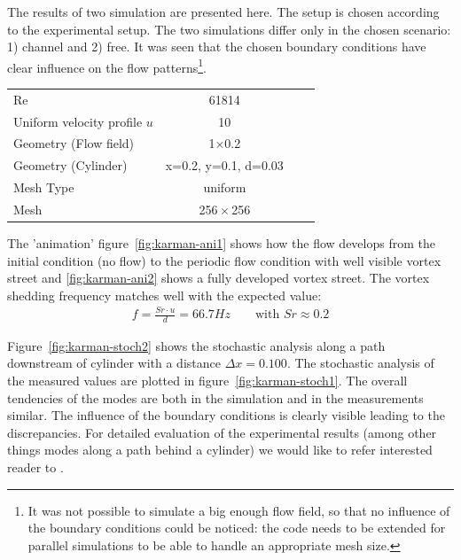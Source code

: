 \noii The results of two simulation are presented here. The setup is chosen according to the experimental setup. The two simulations differ only in the chosen scenario: 1) channel and 2) free. It was seen that the chosen boundary conditions have clear influence on the flow patterns\footnote{It was not possible to simulate a big enough flow field, so that no influence of the boundary conditions could be noticed: the code needs to be extended for parallel simulations to be able to handle an appropriate mesh size.}.




\begin{center}
\begin{tabular}{lccc}
\hline 
Re                   & 61814\\      
Uniform velocity profile $u$         & 10 \\
Geometry (Flow field)  &  1$\times$0.2\\
Geometry (Cylinder)  &  x=0.2, y=0.1, d=0.03\\
Mesh Type & uniform \\
Mesh      & 256\,$\times$\,256 \\\hline 
\end{tabular}
\end{center}

\noii The 'animation' figure~\ref{fig:karman-ani1} shows how the flow develops from the initial condition (no flow) to the periodic flow condition with well visible vortex street  and \ref{fig:karman-ani2} shows a fully developed vortex street. The vortex shedding frequency matches well with the expected value:
\begin{align*}
f=\frac{Sr \cdot u}{d}=66.7Hz \qquad \text{with } Sr\approx0.2
\end{align*}

\noii Figure~\ref{fig:karman-stoch2} shows the stochastic analysis along a path downstream of cylinder with a distance $\Delta x = 0.100$. The stochastic analysis of the measured values are plotted in figure~\ref{fig:karman-stoch1}. The overall tendencies of the modes are both in the simulation and in the measurements similar. The influence of the boundary conditions is clearly visible leading to the discrepancies. For detailed evaluation of the experimental results (among other things modes along a path behind a cylinder) we would like to refer interested reader to \citep{koehler2015}. 

\newcommand{\inkarman}[1]{\texttt{[image: \#1]}}

